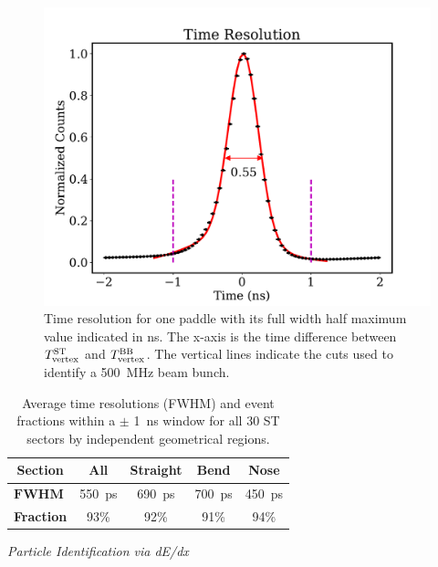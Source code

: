 \begin{figure}[!htb]
  \centering
  \includegraphics[width=1.0\linewidth]{figures/st_tr_fit.pdf}
  \caption{Time resolution for one paddle with its full width half
    maximum value indicated in ns.  The x-axis is the time difference
    between $T^{\rm ST}_{\rm vertex}$ and $T^{\rm BB}_{\rm vertex}$.
    The vertical lines indicate the cuts used to identify a 500~MHz beam bunch.}
                \label{fig:st-time-resolution}
\end{figure}  

\begin{table}[htbp]
  \centering
  \begin{tabular}{@{} l *4c @{}}
    \hline
    \multicolumn{1}{c}{\textbf{Section}}    & \textbf{All}  & \textbf{Straight}  & \textbf{Bend}  & \textbf{Nose}  \\ 
    \hline
    $\mathbf{FWHM}$ & 550~ps & 690~ps & 700~ps & 450~ps \\ 
    \textbf{Fraction} & 93\% & 92\% & 91\% & 94\% \\\hline
  \end{tabular}
  \caption{Average time resolutions (FWHM) and event fractions within a $\pm$ 1~ns window for all 30 ST sectors by independent geometrical regions.}
  \label{table:st-time-resolution}
\end{table}  

\smallskip

{\it Particle Identification via dE/dx}

\smallskip

